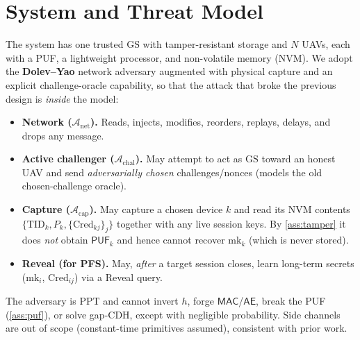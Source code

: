 \documentclass[11pt]{article}
\theoremstyle{plain}
\theoremstyle{definition}
\newcommand{\GS}{\mathrm{GS}}
\newcommand{\PUF}{\mathsf{PUF}}
\newcommand{\TID}{\mathrm{TID}}
\newcommand{\Cred}{\mathrm{Cred}}
\newcommand{\mk}{\mathrm{mk}}
\newcommand{\MAC}{\mathsf{MAC}}
\newcommand{\aead}{\mathsf{AE}}
\newcommand{\adv}{\mathcal{A}}
\begin{document}
\section{System and Threat Model}
\label{sec:model}
The system has one trusted $\GS$ with tamper-resistant storage and
$N$ UAVs, each with a PUF, a lightweight processor, and non-volatile memory
(NVM). We adopt the \textbf{Dolev--Yao} network adversary augmented with
physical capture and an explicit challenge-oracle capability, so that the
attack that broke the previous design is \emph{inside} the model:
\begin{itemize}[leftmargin=1.4em]
\item \textbf{Network ($\adv_{\mathrm{net}}$).} Reads, injects, modifies,
reorders, replays, delays, and drops any message.
\item \textbf{Active challenger ($\adv_{\mathrm{chal}}$).} May attempt to act
as $\GS$ toward an honest UAV and send \emph{adversarially chosen}
challenges/nonces (models the old chosen-challenge oracle).
\item \textbf{Capture ($\adv_{\mathrm{cap}}$).} May capture a chosen device
$k$ and read its NVM contents $\{\TID_k,P_k,\{\Cred_{kj}\}_j\}$ together with
any live session keys. By \cref{ass:tamper} it does \emph{not} obtain $\PUF_k$ and hence
cannot recover $\mk_k$ (which is never stored).
\item \textbf{Reveal (for PFS).} May, \emph{after} a target session closes,
learn long-term secrets ($\mk_i$, $\Cred_{ij}$) via a \textsf{Reveal} query.
\end{itemize}
The adversary is PPT and cannot invert $h$, forge $\MAC$/$\aead$, break the PUF
(\cref{ass:puf}), or solve gap-CDH, except with negligible probability. Side
channels are out of scope (constant-time primitives assumed), consistent
with prior work.

\end{document}
